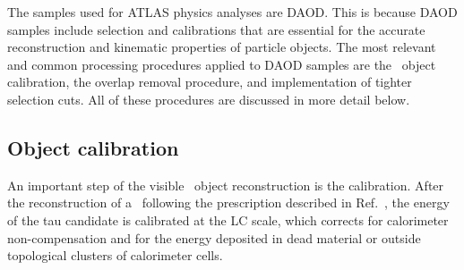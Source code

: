 	The samples used for \ac{ATLAS} physics analyses are \ac{DAOD}. This is because \ac{DAOD} samples include selection and calibrations that are essential for the accurate reconstruction and kinematic properties of particle objects.
	The most relevant and common processing procedures applied to \ac{DAOD} samples are the \htau\ object calibration, the overlap removal procedure, and implementation of tighter selection cuts.
	 All of these procedures are discussed in more detail below. 
	
	
	
		\subsection*{Object calibration}
	An important step of the visible \htau\ object reconstruction is the calibration. After the reconstruction of a \htau\ following the prescription described in Ref.~\cite{ATL-PHYS-PUB-2015-045}, the energy of the tau candidate is calibrated at the \ac{LC} scale, which corrects for calorimeter non-compensation and for the energy deposited in dead material or outside topological clusters of calorimeter cells.
	
